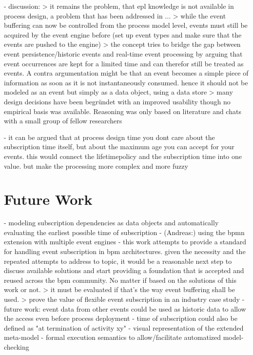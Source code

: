 - discussion:
> it remains the problem, that epl knowledge is not available in process design, a problem that has been addressed in ...
> while the event buffering can now be controlled from the process model level, events must still be acquired by the event engine before (set up event types and make sure that the events are pushed to the engine)
> the concept tries to bridge the gap between event persistence/historic events and real-time event processing by arguing that event occurrences are kept for a limited time and can therefor still be treated as events. A contra argumentation might be that an event becomes a simple piece of information as soon as it is not instantaneously consumed. hence it should not be modeled as an event but simply as a data object, using a data store
> many design decisions have been begründet with an improved usability though no empirical basis was available. Reasoning was only based on literature and chats with a small group of fellow researchers

- it can be argued that at process design time you dont care about the subscription time itself, but about the maximum age you can accept for your events. this would connect the lifetimepolicy and the subscription time into one value. but make the processing more complex and more fuzzy

\section{Future Work}

- modeling subscription dependencies as data objects and automatically evaluating the earliest possible time of subscription
- (Andreas:) using the bpmn extension with multiple event engines
- this work attempts to provide a standard for handling event subscription in bpm architectures. given the necessity and the repeated attempts to address to topic, it would be a reasonable next step to discuss available solutions and start providing a foundation that is accepted and reused across the bpm community. No matter if based on the solutions of this work or not.
> it must be evaluated if that's the way event buffering shall be used. > prove the value of flexible event subscription in an industry case study
- future work: event data from other events could be used as historic data to allow the access even before process deployment
- time of subscription could also be defined as "at termination of activity xy"
- visual representation of the extended meta-model
- formal execution semantics to allow/facilitate automatized model-checking